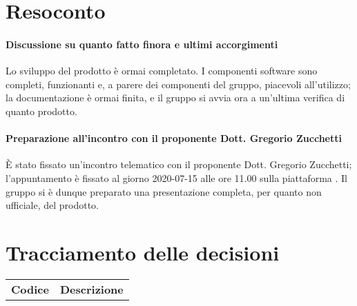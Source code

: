 \documentclass{article}
\begin{document}
\section{Resoconto}%
\label{resoconto}
\paragraph*{Discussione su quanto fatto finora e ultimi accorgimenti}
Lo sviluppo del prodotto è ormai completato. I componenti software sono completi, funzionanti e, a parere dei componenti del gruppo, piacevoli all'utilizzo; 
la documentazione è ormai finita, e il gruppo si avvia ora a un'ultima verifica di quanto prodotto.

\paragraph*{Preparazione all'incontro con il proponente Dott. Gregorio Zucchetti}
È stato fissato un'incontro telematico con il proponente Dott. Gregorio Zucchetti; l'appuntamento è fissato al giorno 2020-07-15 alle ore 11.00 sulla piattaforma .
Il gruppo si è dunque preparato una presentazione completa, per quanto non ufficiale, del prodotto.

\section{Tracciamento delle decisioni}
\begin{table}[H]
  \centering
  \begin{tabular}{p{4cm}|p{12cm}}
    \rowcolor{lightgray}
    \textbf{Codice}  & \textbf{Descrizione}      \\
  \end{tabular}
\end{table}
\end{document}
